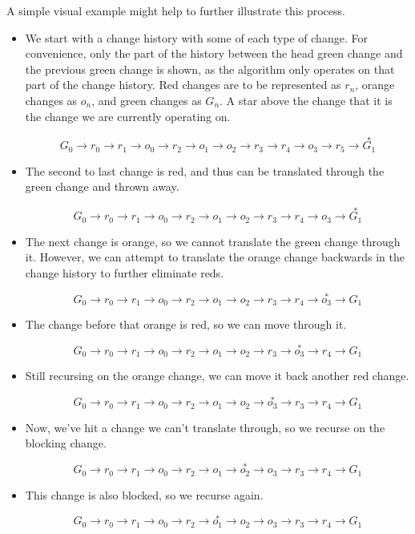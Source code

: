 \documentclass{article}
\begin{document}
A simple visual example 
might help to further illustrate this process.
\begin{itemize}
\item We start with a change history 
with some of each type of change. 
For convenience, 
only the part of the history 
between the head green change 
and the previous green change 
is shown, 
as the algorithm only operates 
on that part of the 
change history. 
Red changes are to be represented as $r_n$, 
orange changes as $o_n$, 
and green changes as $G_n$. 
A star above the change
that it is the change we are currently operating on.

\[G_0\to r_0\to r_1\to o_0
\to r_2\to o_1\to o_2\to r_3
\to r_4\to o_3\to r_5 \to \stackrel{*}{G_1}\]
\item The second to last change is red,
and thus can be translated
through the green change
and thrown away.

\[G_0\to r_0\to r_1\to o_0
\to r_2\to o_1\to o_2\to r_3
\to r_4\to o_3\to \stackrel{*}{G_1}\]

\item The next change is orange,
so we cannot translate the green change
through it.
However, we can attempt
to translate the orange change
backwards in the change history
to further eliminate reds.

\[G_0\to r_0\to r_1\to o_0
\to r_2\to o_1\to o_2\to r_3
\to r_4\to \stackrel{*}{o_3}\to G_1\]

\item The change before that orange is red, 
so we can move through it.

\[G_0\to r_0\to r_1\to o_0
\to r_2\to o_1\to o_2\to r_3
\to \stackrel{*}{o_3}\to r_4 \to G_1\]

\item Still recursing on the orange change, 
we can move it back another red change.

\[G_0\to r_0\to r_1\to o_0
\to r_2\to o_1\to o_2 \to
\stackrel{*}{o_3}\to r_3 \to r_4 \to G_1\]

\item Now, we've hit a change we can't translate through, 
so we recurse on the blocking change.

\[G_0\to r_0\to r_1\to o_0
\to r_2\to o_1\to \stackrel{*}{o_2}\to o_3
\to r_3 \to r_4 \to G_1\]

\item This change is also blocked, 
so we recurse again.

\[G_0\to r_0\to r_1\to o_0
\to r_2\to \stackrel{*}{o_1}\to o_2 \to o_3
\to r_3 \to r_4 \to G_1\]


\end{itemize}
\end{document}
